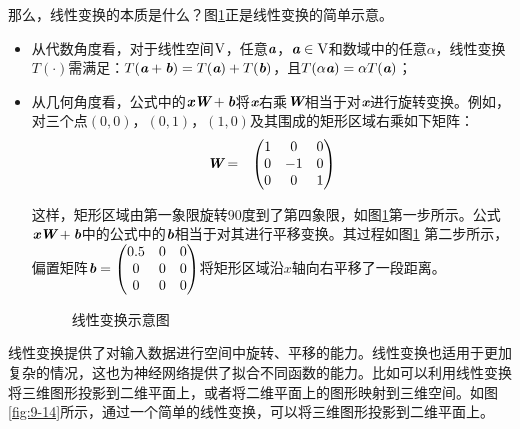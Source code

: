 \parinterval 那么，线性变换的本质是什么？图\ref{fig:9-13}正是线性变换的简单示意。

\begin{itemize}
\vspace{0.5em}
\item 从代数角度看，对于线性空间$ \textrm V $，任意$ {\textbf{\em a}}$，${\textbf{\em a}}\in {\textrm V} $和数域中的任意$ \alpha $，线性变换$ T(\cdot) $需满足：$ T({\textbf{\em a}}+{\textbf{\em b}})=T({\textbf{\em a}})+T({\textbf{\em b}}) $，且$ T(\alpha {\textbf{\em a}})=\alpha T({\textbf{\em a}}) $；
\vspace{0.5em}
\item 从几何角度看，公式中的${\textbf{\em x}}{\textbf{\em W}}+{\textbf{\em b}}$将${\textbf{\em x}}$右乘${\textbf{\em W}}$相当于对$ {\textbf{\em x}} $进行旋转变换。例如，对三个点$ (0,0) $，$ (0,1) $，$ (1,0) $及其围成的矩形区域右乘如下矩阵：
    \begin{eqnarray}
    {\textbf{\em W}}&=&\begin{pmatrix} 1 & 0 & 0\\ 0 & -1 & 0\\ 0 & 0 & 1\end{pmatrix}
    \label{eq:9-106}
    \end{eqnarray}

    这样，矩形区域由第一象限旋转90度到了第四象限，如图\ref{fig:9-13}第一步所示。公式$ {\textbf{\em x}} {\textbf{\em W}}+{\textbf{\em b}}$中的公式中的${\textbf{\em b}}$相当于对其进行平移变换。其过程如图\ref{fig:9-13} 第二步所示，偏置矩阵$ {\textbf{\em b}}=\begin{pmatrix} 0.5 & 0 & 0\\ 0 & 0 & 0\\ 0 & 0 & 0\end{pmatrix} $将矩形区域沿$x$轴向右平移了一段距离。

\begin{figure}[htp]
\centering

\caption{线性变换示意图}
\label{fig:9-13}
\end{figure}
\vspace{0.5em}
\end{itemize}


\parinterval 线性变换提供了对输入数据进行空间中旋转、平移的能力。线性变换也适用于更加复杂的情况，这也为神经网络提供了拟合不同函数的能力。比如可以利用线性变换将三维图形投影到二维平面上，或者将二维平面上的图形映射到三维空间。如图\ref{fig:9-14}所示，通过一个简单的线性变换，可以将三维图形投影到二维平面上。

